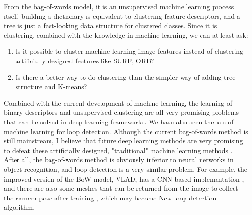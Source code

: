 From the bag-of-words model, it is an unsupervised machine learning process itself--building a dictionary is equivalent to clustering feature descriptors, and a tree is just a fast-looking data structure for clustered classes. Since it is clustering, combined with the knowledge in machine learning, we can at least ask:

\begin{enumerate}
\item Is it possible to cluster machine learning image features instead of clustering artificially designed features like SURF, ORB?
\item Is there a better way to do clustering than the simpler way of adding tree structure and K-means?
\end{enumerate}

Combined with the current development of machine learning, the learning of binary descriptors and unsupervised clustering are all very promising problems that can be solved in deep learning frameworks. We have also seen the use of machine learning for loop detection. Although the current bag-of-words method is still mainstream, I believe that future deep learning methods are very promising to defeat these artificially designed, "traditional" machine learning methods \textsuperscript{\cite{Gao2015, Gao2015b}}. After all, the bag-of-words method is obviously inferior to neural networks in object recognition, and loop detection is a very similar problem. For example, the improved version of the BoW model, VLAD, has a CNN-based implementation \cite{Arandjelovic2016, AngelinaUy2018}, and there are also some meshes that can be returned from the image to collect the camera pose after training \cite{Kendall2015}, which may become New loop detection algorithm.

